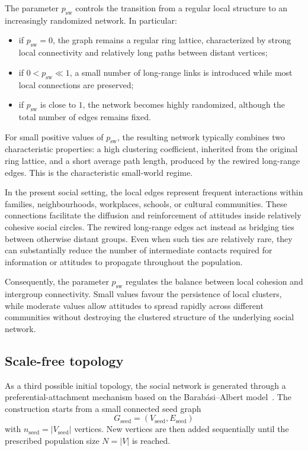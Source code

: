 \documentclass[11pt,a4paper]{article}
\begin{document}
	The parameter $p_{\mathrm{sw}}$ controls the transition from a regular local structure to an increasingly randomized network. In particular:
	\begin{itemize}
		\item if $p_{\mathrm{sw}}=0$, the graph remains a regular ring lattice, characterized by strong local connectivity and relatively long paths between distant vertices;
		
		\item if $0<p_{\mathrm{sw}}\ll 1$, a small number of long-range links is introduced while most local connections are preserved;
		
		\item if $p_{\mathrm{sw}}$ is close to $1$, the network becomes highly randomized, although the total number of edges remains fixed.
	\end{itemize}
	
	For small positive values of $p_{\mathrm{sw}}$, the resulting network typically combines two characteristic properties: a high clustering coefficient, inherited from the original ring lattice, and a short average path length, produced by the rewired long-range edges. This is the characteristic small-world regime.
	
	In the present social setting, the local edges represent frequent interactions within families, neighbourhoods, workplaces, schools, or cultural communities. These connections facilitate the diffusion and reinforcement of attitudes inside relatively cohesive social circles.
	The rewired long-range edges act instead as bridging ties between otherwise distant groups. Even when such ties are relatively rare, they can substantially reduce the number of intermediate contacts required for information or attitudes to propagate throughout the population.
	
	Consequently, the parameter $p_{\mathrm{sw}}$ regulates the balance between local cohesion and intergroup connectivity. Small values favour the persistence of local clusters, while moderate values allow attitudes to spread rapidly across different communities without destroying the clustered structure of the underlying social network.
	
	\subsection{Scale-free topology}
	As a third possible initial topology, the social network is generated through a preferential-attachment mechanism based on the Barab\'asi--Albert model~\cite{barabasi1999}. The construction starts from a small connected seed graph
	$$
	G_{\mathrm{seed}}=(V_{\mathrm{seed}},E_{\mathrm{seed}})
	$$
	with $ n_{\mathrm{seed}}=|V_{\mathrm{seed}}|$ vertices. New vertices are then added sequentially until the prescribed
	population size $N=|V|$ is reached.
	
\end{document}
